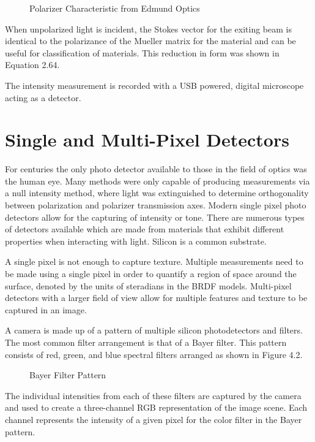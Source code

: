 \begin{figure}[!htb]
    \begin{center}
    \end{center}
    \caption{Polarizer Characteristic from Edmund Optics}
    \label{fig:polarization}
\end{figure}
When unpolarized light is incident, the Stokes vector for the exiting beam is identical to the polarizance of the Mueller matrix for the material and can be useful for classification of materials.  This reduction in form was shown in Equation 2.64.

The intensity measurement is recorded with a USB powered, digital microscope acting as a detector.

\section{Single and Multi-Pixel Detectors}
For centuries the only photo detector available to those in the field of optics was the human eye.  Many methods were only capable of producing measurements via a null intensity method, where light was extinguished to determine orthogonality between polarization and polarizer transmission axes.  Modern single pixel photo detectors allow for the capturing of intensity or tone.  There are numerous types of detectors available which are made from materials that exhibit different properties when interacting with light.  Silicon is a common substrate.

A single pixel is not enough to capture texture.  Multiple measurements need to be made using a single pixel in order to quantify a region of space around the surface, denoted by the units of steradians in the BRDF models.  Multi-pixel detectors with a larger field of view allow for multiple features and texture to be captured in an image.

A camera is made up of a pattern of multiple silicon photodetectors and filters.  The most common filter arrangement is that of a Bayer filter.  This pattern consists of red, green, and blue spectral filters arranged as shown in Figure 4.2.
\begin{figure}[!htb]
    \begin{center}
    \end{center}
    \caption{Bayer Filter Pattern}
    \label{fig:polarization}
\end{figure}
%
The individual intensities from each of these filters are captured by the camera and used to create a three-channel RGB representation of the image scene.  Each channel represents the intensity of a given pixel for the color filter in the Bayer pattern.

